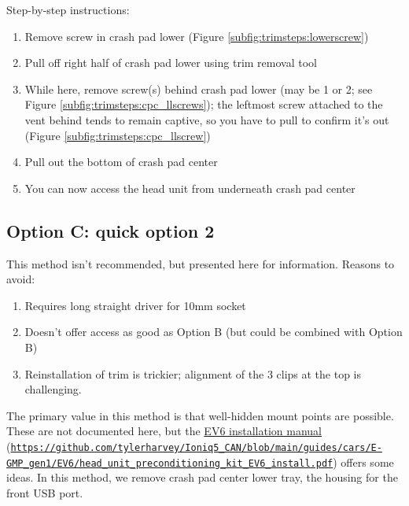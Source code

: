 \documentclass[superscriptaddress,onecolumn,floatfix]{revtex4-2}
\begin{document}
Step-by-step instructions:
\begin{enumerate}
  \item Remove screw in crash pad lower (Figure \ref{subfig:trimsteps:lowerscrew})
  \item Pull off right half of crash pad lower using trim removal tool 
  \item While here, remove screw(s) behind crash pad lower (may be 1 or 2; see Figure \ref{subfig:trimsteps:cpc_llscrews}); the leftmost screw attached to the vent behind tends to remain captive, so you have to pull to confirm it's out (Figure \ref{subfig:trimsteps:cpc_llscrew})
  \item Pull out the bottom of crash pad center
  \item You can now access the head unit from underneath crash pad center
\end{enumerate}

\subsection{Option C: quick option 2}

This method isn't recommended, but presented here for information. Reasons to avoid:
\begin{enumerate}
  \item Requires long straight driver for 10mm socket
  \item Doesn't offer access as good as Option B (but could be combined with Option B)
  \item Reinstallation of trim is trickier; alignment of the 3 clips at the top is challenging. 
\end{enumerate}
The primary value in this method is that well-hidden mount points are possible. These are not documented here, but the \href{https://github.com/tylerharvey/Ioniq5_CAN/blob/main/guides/cars/E-GMP_gen1/EV6/head_unit_preconditioning_kit_EV6_install.pdf}{EV6 installation manual} (\href{https://github.com/tylerharvey/Ioniq5_CAN/blob/main/guides/cars/E-GMP_gen1/EV6/head_unit_preconditioning_kit_EV6_install.pdf}{\nolinkurl{https://github.com/tylerharvey/Ioniq5_CAN/blob/main/guides/cars/E-GMP_gen1/EV6/head_unit_preconditioning_kit_EV6_install.pdf}}) offers some ideas. In this method, we remove crash pad center lower tray, the housing for the front USB port. 
\end{document}

